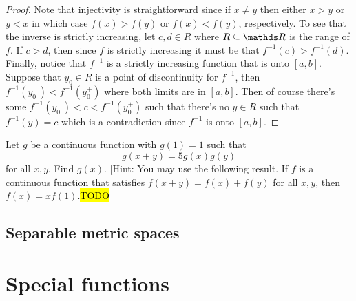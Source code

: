 \begin{proof}
Note that injectivity is straightforward since if $x\neq y$ then
either $x>y$ or $y<x$ in which case $f\left(x\right)>f\left(y\right)$
or $f\left(x\right)<f\left(y\right)$, respectively. To see that the
inverse is strictly increasing, let $c,d\in R$ where $R\subseteq\R$
is the range of $f$. If $c>d$, then since $f$ is strictly increasing
it must be that $f^{-1}\left(c\right)>f^{-1}\left(d\right)$. Finally,
notice that $f^{-1}$ is a strictly increasing function that is onto
$\left[a,b\right]$. Suppose that $y_{0}\in R$ is a point of discontinuity
for $f^{-1}$, then $f^{-1}\left(y_{0}^{-}\right)<f^{-1}\left(y_{0}^{+}\right)$
where both limits are in $\left[a,b\right].$ Then of course there's
some $f^{-1}\left(y_{0}^{-}\right)<c<f^{-1}\left(y_{0}^{+}\right)$
such that there's no $y\in R$ such that $f^{-1}\left(y\right)=c$
which is a contradiction since $f^{-1}$ is onto $\left[a,b\right].$
\end{proof}
\begin{example}
\label{exa:isi2008samplepsb3} Let $g$ be a continuous function with
$g(1)=1$ such that 
\[
g(x+y)=5g(x)g(y)
\]
 for all $x,y$. Find $g(x)$. {[}Hint: You may use the following
result. If $f$ is a continuous function that satisfies $f(x+y)=f(x)+f(y)$
for all $x,y$, then $f(x)=xf(1)$.\hl{TODO}
\end{example}


\subsection{Separable metric spaces}

\section{Special functions\label{sec:specialFunctions}}
